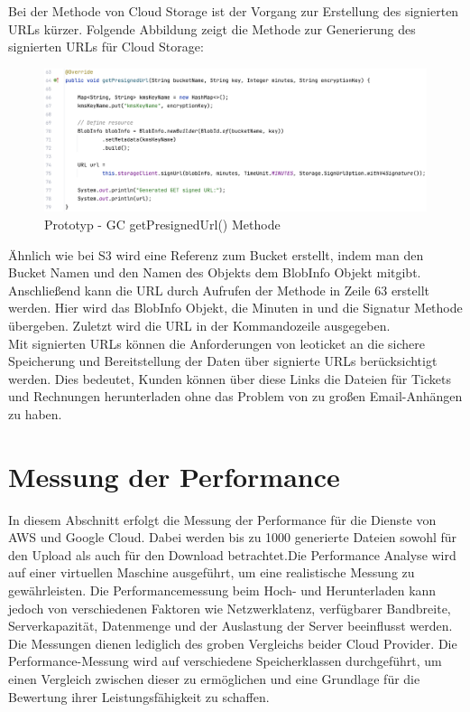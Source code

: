 \newpage

Bei der Methode von Cloud Storage ist der Vorgang zur Erstellung des signierten URLs kürzer. Folgende Abbildung zeigt die Methode zur Generierung des signierten URLs für Cloud Storage:

\begin{figure}[h]
	\centering
	\includegraphics[width=12cm,keepaspectratio]{Pictures/GCgetSignedUrl.png}
	\caption{Prototyp - GC getPresignedUrl() Methode} 
\end{figure}

Ähnlich wie bei S3 wird eine Referenz zum Bucket erstellt, indem man den Bucket Namen und den Namen des Objekts dem BlobInfo Objekt mitgibt. Anschließend kann die URL durch Aufrufen der Methode in Zeile 63 erstellt werden. Hier wird das BlobInfo Objekt, die Minuten in und die Signatur Methode übergeben. Zuletzt wird die URL in der Kommandozeile ausgegeben.\\

Mit signierten URLs können die Anforderungen von leoticket an die sichere Speicherung und Bereitstellung der Daten über signierte URLs berücksichtigt werden. Dies bedeutet, Kunden können über diese Links die Dateien für Tickets und Rechnungen herunterladen ohne das Problem von zu großen Email-Anhängen zu haben.\\

\newpage

\section{Messung der Performance}

In diesem Abschnitt erfolgt die Messung der Performance für die Dienste von AWS und Google Cloud. Dabei werden bis zu 1000 generierte Dateien sowohl für den Upload als auch für den Download betrachtet.Die Performance Analyse wird auf einer virtuellen Maschine ausgeführt, um eine realistische Messung zu gewährleisten. Die Performancemessung beim Hoch- und Herunterladen kann jedoch von verschiedenen Faktoren wie Netzwerklatenz, verfügbarer Bandbreite, Serverkapazität, Datenmenge und der Auslastung der Server beeinflusst werden. Die Messungen dienen lediglich des groben Vergleichs beider Cloud Provider. Die Performance-Messung wird auf verschiedene Speicherklassen durchgeführt, um einen Vergleich zwischen dieser zu ermöglichen und eine Grundlage für die Bewertung ihrer Leistungsfähigkeit zu schaffen.\\


